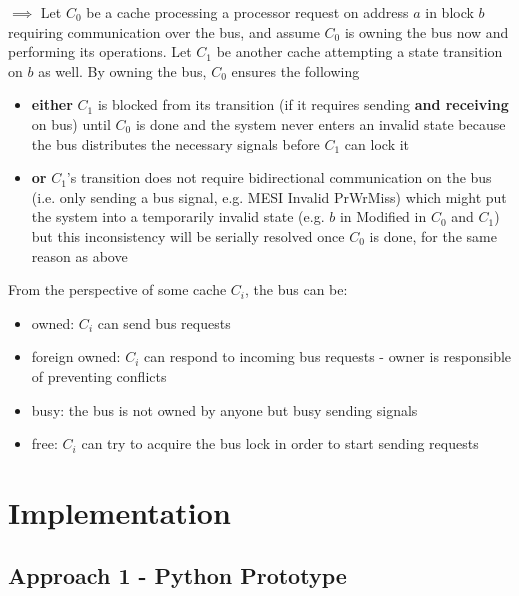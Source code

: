 \documentclass{article}
\begin{document}
\begin{multicols}{2}
$\implies$ Let $C_0$ be a cache processing a processor request on address $a$ in block $b$ requiring communication over the bus, and assume $C_0$ is owning the bus now and performing its operations. Let $C_1$ be another cache attempting a state transition on $b$ as well. By owning the bus, $C_0$ ensures the following

\begin{itemize}
    \item \textbf{either} $C_1$ is blocked from its transition (if it requires sending \textbf{and receiving} on bus) until $C_0$ is done and the system never enters an invalid state because the bus distributes the necessary signals before $C_1$ can lock it
    \item \textbf{or} $C_1$'s transition does not require bidirectional communication on the bus (i.e. only sending a bus signal, e.g. MESI Invalid PrWrMiss) which might put the system into a temporarily invalid state (e.g. $b$ in Modified in $C_0$ and $C_1$) but this inconsistency will be serially resolved once $C_0$ is done, for the same reason as above
\end{itemize}

From the perspective of some cache $C_i$, the bus can be:

\begin{itemize}
    \item owned: $C_i$ can send bus requests
    \item foreign owned: $C_i$ can respond to incoming bus requests - owner is responsible of preventing conflicts
    \item busy: the bus is not owned by anyone but busy sending signals
    \item free: $C_i$ can try to acquire the bus lock in order to start sending requests
\end{itemize}

\end{multicols}

\section{Implementation}

\subsection{Approach 1 - Python Prototype}
\end{document}
